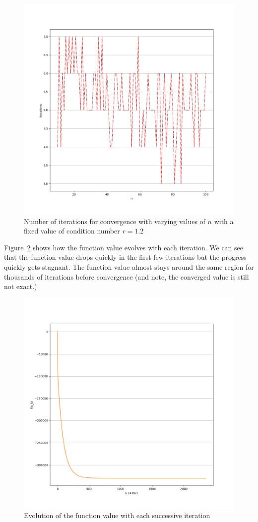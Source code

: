 \documentclass[11pt]{article}
\begin{document}
\begin{figure}[!htbp]
    \includegraphics[width=\textwidth]{./niter_fix_r_good.png}
    \caption{Number of iterations for convergence with varying values of $n$
    with a fixed value of condition number $r=1.2$\label{fig:good}}
\end{figure}
Figure~\ref{fig:fv} shows how the function value evolves with each iteration.
We can see that the function value drops quickly in the first few iterations but
the progress quickly gets stagnant. The function value almost stays around the same
region for thousands of iterations before convergence (and note, the converged
value is still not exact.)
\begin{figure}[!htbp]
    \includegraphics[width=\textwidth]{./function_value.png}
    \caption{Evolution of the function value with each successive iteration\label{fig:fv}}
\end{figure}
\end{document}
